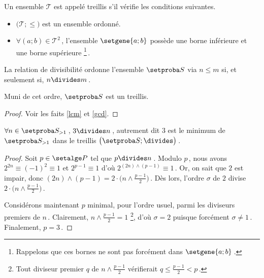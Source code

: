 Un ensemble $\mathcal{T}$ est appelé treillis s'il vérifie les conditions suivantes.
%
	\begin{itemize}
		\item $\big( \mathcal{T} ; \leq \big)$ est un ensemble ordonné.

		\item $\forall (a ; b) \in \mathcal{T}^2$\,, l'ensemble $\setgene{a ; b}$ possède une borne inférieure et une borne supérieure
		\footnote{
			Rappelons que ces bornes ne sont pas forcément dans $\setgene{a ; b}$\,.
		}\,. 
	\end{itemize}


\begin{fact}
	La relation de divisibilité ordonne l'ensemble $\ourset$ via $n  \leq m$ si, et seulement si, $n \divides m$\,.
	
	\medskip
	
	Muni de cet ordre, $\ourset$ est un treillis.
\end{fact}

\begin{proof}
	Voir les faits \ref{lcm} et \ref{gcd}.
\end{proof}





\begin{fact}
	$\forall n \in \ourset_{>1}$\,, $3 \divides n$\,, autrement dit $3$ est le minimum de $\ourset_{>1}$ dans le treillis $\big( \ourset ; \divides \big)$\,.
\end{fact}

\begin{proof}
	Soit $p \in \primeset$ tel que $p \divides n$\,.
	Modulo $p$\,, nous avons
	$2^{2n} \equiv (- 1)^2 \equiv 1$
	et
	$2^{p-1} \equiv 1$
	d'où
	$2^{(2n) \wedge (p-1)} \equiv 1$\,.
	Or, on sait que $2$ est impair, donc $(2n) \wedge (p-1) = 2 \cdot \big( n \wedge \frac{p-1}{2} \big)$\,.
	Dès lors, l'ordre $\sigma$ de $2$ divise $2 \cdot \big( n \wedge \frac{p-1}{2} \big)$\,.
	
	\medskip
	
	Considérons maintenant $p$ minimal, pour l'ordre usuel, parmi les diviseurs premiers de $n$\,.
	Clairement, $n \wedge \frac{p-1}{2} = 1$
	\footnote{
		Tout diviseur premier $q$ de $n \wedge \frac{p-1}{2}$ vérifierait $q \leq \frac{p-1}{2} < p$\,.
	},
	d'où $\sigma = 2$ puisque forcément $\sigma \neq 1$\,.
	Finalement, $p = 3$\,.
\end{proof}




